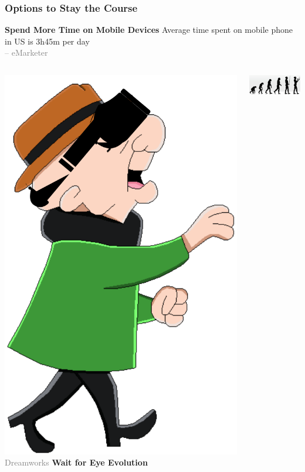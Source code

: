 \documentclass[10pt]{beamer}
\begin{document}
\begin{frame}
\frametitle{Options to Stay the Course}
  \textbf{Spend More Time on Mobile Devices}\newline
  Average time spent on mobile phone in US is 3h45m per day \\
  {\tiny \textcolor{gray}{-- eMarketer}}
\begin{columns}
  \includegraphics[width=.96\textwidth]{Figures/Visual-magoo.png}
  \newline
  {\tiny \textcolor{gray}{\textcopyright Dreamworks}}
  \textbf{Wait for Eye Evolution}
  \begin{center}
  \includegraphics[width=2in]{Figures/Visual-Evolution.png}

\end{center}
\end{columns}
\end{frame}
\end{document}
